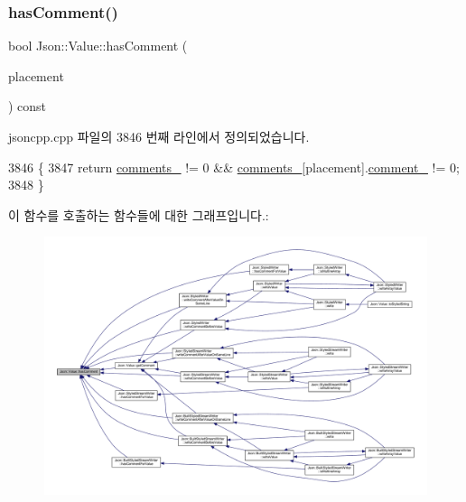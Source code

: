 \mbox{\label{class_json_1_1_value_a65d8e3ab6a5871cbd019a3e0f0b944a3}} 
\subsubsection{\texorpdfstring{has\+Comment()}{hasComment()}}
{\footnotesize\ttfamily bool Json\+::\+Value\+::has\+Comment (\begin{DoxyParamCaption}\item[{\hyperlink{namespace_json_a4fc417c23905b2ae9e2c47d197a45351}{Comment\+Placement}}]{placement }\end{DoxyParamCaption}) const}



jsoncpp.\+cpp 파일의 3846 번째 라인에서 정의되었습니다.


\begin{DoxyCode}
3846                                                        \{
3847   \textcolor{keywordflow}{return} \hyperlink{class_json_1_1_value_a2016564cabc7a29208e97bd0b782a4e4}{comments\_} != 0 && \hyperlink{class_json_1_1_value_a2016564cabc7a29208e97bd0b782a4e4}{comments\_}[placement].\hyperlink{struct_json_1_1_value_1_1_comment_info_a020f19c7098bab8ec8fec14cd1a5afb9}{comment\_} != 0;
3848 \}
\end{DoxyCode}
이 함수를 호출하는 함수들에 대한 그래프입니다.\+:\nopagebreak
\begin{figure}[H]
\begin{center}
\leavevmode
\includegraphics[width=350pt]{class_json_1_1_value_a65d8e3ab6a5871cbd019a3e0f0b944a3_icgraph}
\end{center}
\end{figure}
\mbox{\label{class_json_1_1_value_a32b86b71564157f40f880f5736be822a}} 
